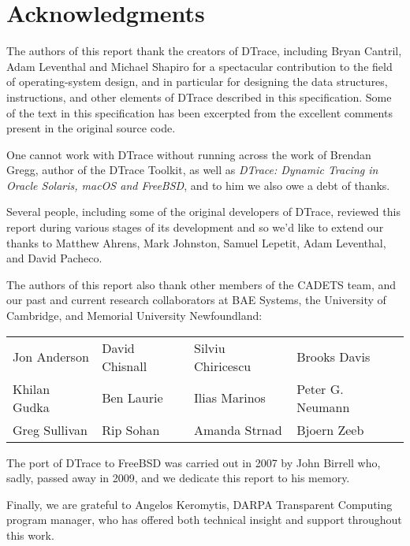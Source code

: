 \section*{Acknowledgments}
The authors of this report thank the creators of DTrace, including
Bryan Cantril, Adam Leventhal and Michael Shapiro for a spectacular
contribution to the field of operating-system design, and in
particular for designing the data structures, instructions, and other
elements of DTrace described in this specification.  Some of the text
in this specification has been excerpted from the excellent comments
present in the original source code.

One cannot work with DTrace without running across the work of Brendan
Gregg, author of the DTrace Toolkit, as well as \emph{DTrace: Dynamic
  Tracing in Oracle Solaris, macOS and FreeBSD}, and to him we also
owe a debt of thanks.

Several people, including some of the original developers of DTrace,
reviewed this report during various stages of its development and so
we'd like to extend our thanks to Matthew Ahrens, Mark Johnston,
Samuel Lepetit, Adam Leventhal, and David Pacheco.

The authors of this report also thank other members of the CADETS team, and
our past and current research collaborators at BAE Systems, the University of
Cambridge, and Memorial University Newfoundland:

%
%
\begin{tabular}{llll}
  Jon Anderson & David Chisnall & Silviu Chiricescu & Brooks Davis \\
  Khilan Gudka & Ben Laurie & Ilias Marinos & Peter G. Neumann \\
  Greg Sullivan & Rip Sohan & Amanda Strnad & Bjoern Zeeb
\end{tabular}

\bigskip

%
%
%

The port of DTrace to FreeBSD was carried out in 2007 by John Birrell
who, sadly, passed away in 2009, and we dedicate this report to his
memory.

\noindent
Finally, we are grateful to Angelos Keromytis, DARPA Transparent Computing
program manager, who has offered both technical insight and support throughout
this work.
